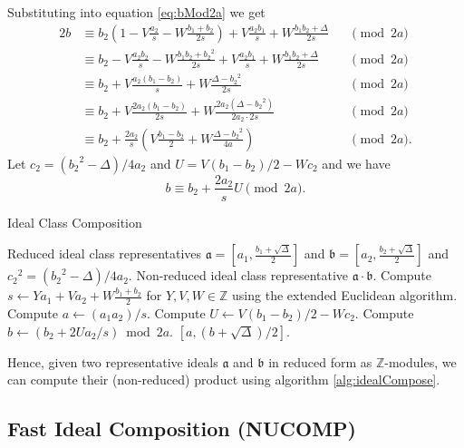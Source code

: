 \documentclass{ucalgthes1}
\theoremstyle{plain}
\theoremstyle{definition}
\newcommand{\ZZ}{\mathbb{Z}}
\begin{document}
\noindent
Substituting into equation \eqref{eq:bMod2a} we get
\begin{alignat*}{2}
	b & \equiv b_2(1-V\frac{a_2}{s} - W\frac{b_1+b_2}{2s}) + V\frac{a_2b_1}{s} + W\frac{b_1b_2 + \Delta}{2s} && \pmod{2a} \\
	& \equiv b_2 - V\frac{a_2b_2}{s} - W\frac{b_1b_2+{b_2}^2}{2s} + V\frac{a_2b_1}{s} + W\frac{b_1b_2 + \Delta}{2s} && \pmod{2a} \\
	& \equiv b_2 + V\frac{a_2(b_1-b_2)}{s} + W\frac{\Delta - {b_2}^2}{2s} && \pmod{2a} \\
	& \equiv b_2 + V\frac{2a_2(b_1-b_2)}{2s} + W\frac{2a_2(\Delta - {b_2}^2)}{2a_2 \cdot 2s} && \pmod{2a} \\
	& \equiv b_2 + \frac{2a_2}{s} \left( V\frac{b_1-b_2}{2} + W\frac{\Delta - {b_2}^2}{4a} \right) && \pmod{2a}.
\end{alignat*}
Let $c_2 = ({b_2}^2 - \Delta)/4a_2$ and $U = V(b_1-b_2)/2 - Wc_2$ and we have
\[
	b \equiv b_2 + \frac{2a_2}{s} U \pmod{2a}.
\]

\begin{algorithm}[b]
\caption{Ideal Class Composition}
\label{alg:idealCompose}
\begin{algorithmic}[1]
\REQUIRE Reduced ideal class representatives $\mathfrak a = \left[a_1, \frac{b_1 + \sqrt\Delta}{2}\right]$ and $\mathfrak b = \left[a_2, \frac{b_2 + \sqrt\Delta}{2}\right]$ and ${c_2}^2 = ({b_2}^2-\Delta)/4a_2$.
\ENSURE Non-reduced ideal class representative $\mathfrak a \cdot \mathfrak b$.
\STATE Compute $s \leftarrow Ya_1 + Va_2 + W\frac{b_1+b_2}{2}$ for $Y, V, W \in \ZZ$ using the extended Euclidean algorithm.
\STATE Compute $a \leftarrow (a_1a_2)/s$.
\STATE Compute $U \leftarrow V(b_1-b_2)/2 - Wc_2$.
\STATE Compute $b \leftarrow (b_2 + 2Ua_2/s) \bmod{2a}$.
\RETURN $[a, (b + \sqrt\Delta)/2]$.
\end{algorithmic}
\end{algorithm}



\noindent
Hence, given two representative ideals $\mathfrak a$ and $\mathfrak b$ in reduced form as $\ZZ$-modules, we can compute their (non-reduced) product using algorithm \ref{alg:idealCompose}.



\subsection{Fast Ideal Composition (NUCOMP)}\label{subsec:nucomp}
\end{document}
